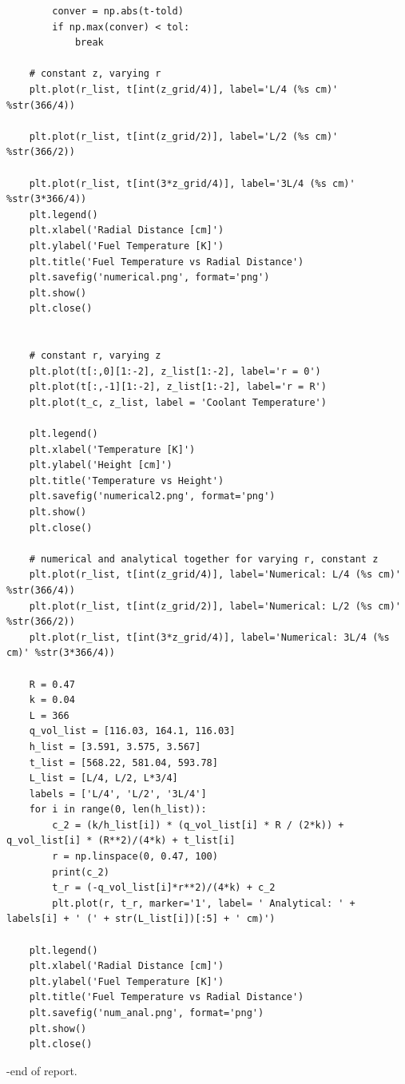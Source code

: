 \documentclass[12pt,letterpaper]{article}
\begin{document}
\begin{appendices}
\begin{verbatim}
        conver = np.abs(t-told)
        if np.max(conver) < tol:
            break

    # constant z, varying r
    plt.plot(r_list, t[int(z_grid/4)], label='L/4 (%s cm)' %str(366/4))

    plt.plot(r_list, t[int(z_grid/2)], label='L/2 (%s cm)' %str(366/2))

    plt.plot(r_list, t[int(3*z_grid/4)], label='3L/4 (%s cm)' %str(3*366/4))
    plt.legend()
    plt.xlabel('Radial Distance [cm]')
    plt.ylabel('Fuel Temperature [K]')
    plt.title('Fuel Temperature vs Radial Distance')
    plt.savefig('numerical.png', format='png')
    plt.show()
    plt.close()


    # constant r, varying z
    plt.plot(t[:,0][1:-2], z_list[1:-2], label='r = 0')
    plt.plot(t[:,-1][1:-2], z_list[1:-2], label='r = R')
    plt.plot(t_c, z_list, label = 'Coolant Temperature')

    plt.legend()
    plt.xlabel('Temperature [K]')
    plt.ylabel('Height [cm]')
    plt.title('Temperature vs Height')
    plt.savefig('numerical2.png', format='png')
    plt.show()
    plt.close()

    # numerical and analytical together for varying r, constant z
    plt.plot(r_list, t[int(z_grid/4)], label='Numerical: L/4 (%s cm)' %str(366/4))
    plt.plot(r_list, t[int(z_grid/2)], label='Numerical: L/2 (%s cm)' %str(366/2))
    plt.plot(r_list, t[int(3*z_grid/4)], label='Numerical: 3L/4 (%s cm)' %str(3*366/4))

    R = 0.47
    k = 0.04
    L = 366
    q_vol_list = [116.03, 164.1, 116.03]
    h_list = [3.591, 3.575, 3.567]
    t_list = [568.22, 581.04, 593.78]
    L_list = [L/4, L/2, L*3/4]
    labels = ['L/4', 'L/2', '3L/4']
    for i in range(0, len(h_list)):
        c_2 = (k/h_list[i]) * (q_vol_list[i] * R / (2*k)) + q_vol_list[i] * (R**2)/(4*k) + t_list[i]
        r = np.linspace(0, 0.47, 100)
        print(c_2)
        t_r = (-q_vol_list[i]*r**2)/(4*k) + c_2
        plt.plot(r, t_r, marker='1', label= ' Analytical: ' + labels[i] + ' (' + str(L_list[i])[:5] + ' cm)')
    
    plt.legend()
    plt.xlabel('Radial Distance [cm]')
    plt.ylabel('Fuel Temperature [K]')
    plt.title('Fuel Temperature vs Radial Distance')
    plt.savefig('num_anal.png', format='png')
    plt.show()
    plt.close()

\end{verbatim}
\end{appendices}

\pagebreak

-end of report.
\end{document}
